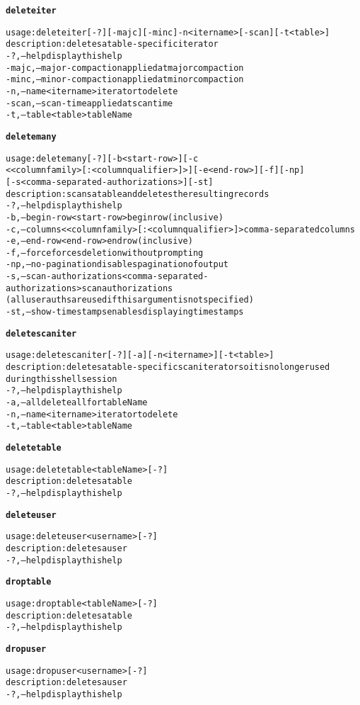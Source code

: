 \begin{alltt}
\textbf{deleteiter}

    usage: deleteiter [-?] [-majc] [-minc] -n <itername> [-scan] [-t <table>]
    description: deletes a table-specific iterator
      -?,--help  display this help
      -majc,--major-compaction  applied at major compaction
      -minc,--minor-compaction  applied at minor compaction
      -n,--name <itername>	iterator to delete
      -scan,--scan-time  applied at scan time
      -t,--table <table>  tableName

\textbf{deletemany}

    usage: deletemany [-?] [-b <start-row>] [-c
    	      <{<columnfamily>[:<columnqualifier>]}>] [-e <end-row>] [-f] [-np]
    	      [-s <comma-separated-authorizations>] [-st]
    description: scans a table and deletes the resulting records
      -?,--help  display this help
      -b,--begin-row <start-row>  begin row (inclusive)
      -c,--columns <{<columnfamily>[:<columnqualifier>]}>  comma-separated columns
      -e,--end-row <end-row>  end row (inclusive)
      -f,--force  forces deletion without prompting
      -np,--no-pagination  disables pagination of output
      -s,--scan-authorizations <comma-separated-authorizations>  scan authorizations
    	      (all user auths are used if this argument is not specified)
      -st,--show-timestamps  enables displaying timestamps

\textbf{deletescaniter}

    usage: deletescaniter [-?] [-a] [-n <itername>] [-t <table>]
    description: deletes a table-specific scan iterator so it is no longer used
    	      during this shell session
      -?,--help  display this help
      -a,--all  delete all for tableName
      -n,--name <itername>	iterator to delete
      -t,--table <table>  tableName

\textbf{deletetable}

    usage: deletetable <tableName> [-?]
    description: deletes a table
      -?,--help  display this help

\textbf{deleteuser}

    usage: deleteuser <username> [-?]
    description: deletes a user
      -?,--help  display this help

\textbf{droptable}

    usage: droptable <tableName> [-?]
    description: deletes a table
      -?,--help  display this help

\textbf{dropuser}

    usage: dropuser <username> [-?]
    description: deletes a user
      -?,--help  display this help


\end{alltt}
